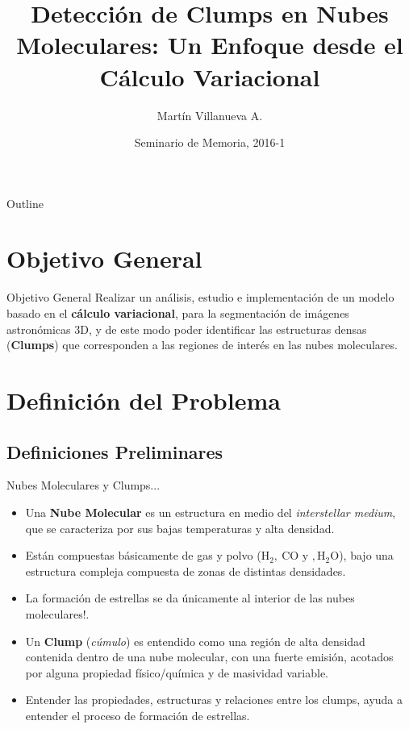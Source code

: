 \documentclass{beamer}
\title{Detección de Clumps en Nubes Moleculares: Un Enfoque desde el Cálculo Variacional}
\author{Martín Villanueva A.\inst{1}}
\institute[Universidad Técnica Federico Santa María] %
{
  \inst{1}%
  Departamento de Informática\\
  Universidad Técnica Federico Santa María}
\date{Seminario de Memoria, 2016-1}
\begin{document}
\begin{frame}
  \titlepage
\end{frame}



\begin{frame}{Outline}
  \tableofcontents
\end{frame}





\section{Objetivo General}

\begin{frame}{Objetivo General}
Realizar un análisis, estudio e implementación de un modelo basado en el \textbf{cálculo variacional}, para la
segmentación de imágenes astronómicas 3D, y de este modo poder identificar las estructuras densas (\textbf{Clumps}) que corresponden a las regiones de interés en las nubes moleculares.
\end{frame}



\section{Definición del Problema}

\subsection{Definiciones Preliminares}

\begin{frame}{Nubes Moleculares y Clumps...}
\begin{itemize}
  \item  Una \textbf{Nube Molecular} es un estructura en medio del \textit{interstellar medium}, que se caracteriza por sus bajas temperaturas y alta densidad.
  \item Están compuestas básicamente de gas y polvo ($\text{H}_2,\ \text{CO y }, \text{H}_2\text{O}$), bajo una estructura compleja compuesta de zonas de distintas densidades.
  \item La formación de estrellas se da únicamente al interior de las nubes moleculares!.
  \item Un \textbf{Clump} (\textit{cúmulo}) es entendido como una región de alta densidad contenida dentro de una nube molecular, con una fuerte emisión, acotados por alguna propiedad físico/química y de masividad variable.
  \item Entender las propiedades, estructuras y relaciones entre los clumps, ayuda a entender el proceso de formación de estrellas.  
\end{itemize}
\end{frame}
\end{document}
